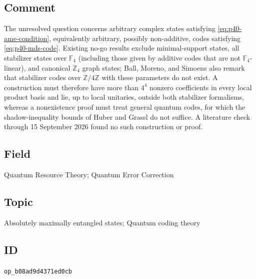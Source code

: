 \subsection*{Comment}

The unresolved question concerns arbitrary complex states satisfying
\eqref{eq:p40-ame-condition}, equivalently arbitrary, possibly non-additive,
codes satisfying \eqref{eq:p40-mds-code}.  Existing no-go results exclude minimal-support
states, all stabilizer states over $\mathbb{F}_{4}$ (including those given by
additive codes that are not $\mathbb{F}_{4}$-linear), and canonical
$\mathbb{Z}_{4}$ graph states; Ball, Moreno, and Simoens also remark that
stabilizer codes over $\mathbb{Z}/4\mathbb{Z}$ with these parameters do not
exist.  A construction must therefore have more than $4^{4}$ nonzero
coefficients in every local product basis and lie, up to local unitaries,
outside both stabilizer formalisms, whereas a nonexistence proof must treat
general quantum codes, for which the shadow-inequality bounds of Huber and
Grassl do not suffice.  A literature check through 15 September 2026 found
no such construction or proof.

\subsection*{Field}

Quantum Resource Theory; Quantum Error Correction

\subsection*{Topic}

Absolutely maximally entangled states; Quantum coding theory

\subsection*{ID}

\texttt{op\_b08ad9d4371ed0cb}
